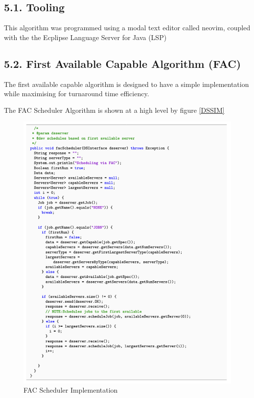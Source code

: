 \documentclass[a4paper]{article} %
\begin{document}
\subsection*{5.1. Tooling}
This algorithm was programmed using a modal text editor called neovim\cite{neovim}, coupled with the the Ecplipse Language Server for Java (LSP)\cite{lsp}

\subsection*{5.2. First Available Capable Algorithm (FAC)}

The first available capable algorithm is designed to have a simple implementation while maximising for turnaround time efficiency.

The FAC Scheduler Algorithm is shown at a high level by figure \ref{DSSIM}
\begin{figure}[H]
    \centering
    \includegraphics[scale=0.8]{images/code.png}
    \caption{FAC Scheduler Implementation}
    \label{code}
\end{figure}
\end{document}
